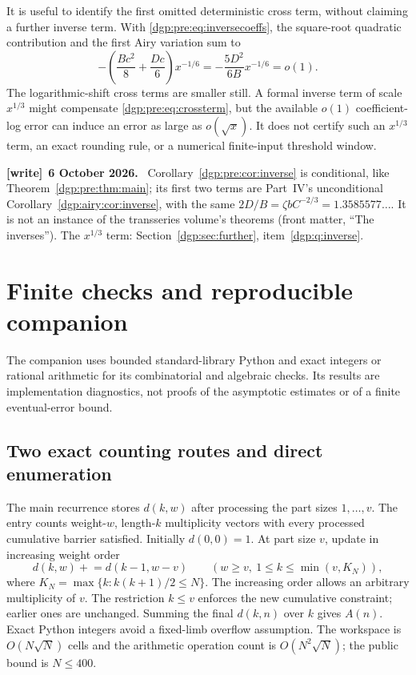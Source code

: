 \documentclass[11pt,letterpaper]{article}
\numberwithin{equation}{section}
\theoremstyle{remark}\newtheorem{remark}[theorem]{Remark}
\newenvironment{writenote}[1][]{\par\smallskip\begingroup\small
 \noindent\textbf{[write]}\if\relax\detokenize{#1}\relax\else~\textbf{#1.}\fi\ }%
 {\par\endgroup\smallskip}
\begin{document}
It is useful to identify the first omitted deterministic cross term,
without claiming a further inverse term. With \eqref{dgp:pre:eq:inversecoeffs},
the square-root quadratic contribution and the first Airy variation
sum to
\begin{equation}
 -\left(\frac{Bc^2}8+\frac{Dc}6\right)x^{-1/6}
 =-\frac{5D^2}{6B}x^{-1/6}=o(1).
 \label{dgp:pre:eq:crossterm}
\end{equation}
The logarithmic-shift cross terms are smaller still. A formal inverse
term of scale $x^{1/3}$ might compensate \eqref{dgp:pre:eq:crossterm}, but the
available $o(1)$ coefficient-log error can induce an error as large as
$o(\sqrt x)$. It does not certify such an $x^{1/3}$ term, an exact
rounding rule, or a numerical finite-input threshold window.
\begin{writenote}[6 October 2026]
Corollary~\ref{dgp:pre:cor:inverse} is conditional, like Theorem~\ref{dgp:pre:thm:main}; its first two terms are Part~IV's unconditional Corollary~\ref{dgp:airy:cor:inverse}, with the same $2D/B=\zeta bC^{-2/3}=1.3585577\ldots$. It is not an instance of the transseries volume's theorems (front matter, ``The inverses''). The $x^{1/3}$ term: Section~\ref{dgp:sec:further}, item~\ref{dgp:q:inverse}.
\end{writenote}

\section{Finite checks and reproducible companion}\label{dgp:pre:sec:companion}
The companion uses bounded standard-library Python and exact integers
or rational arithmetic for its combinatorial and algebraic checks.
Its results are implementation diagnostics, not proofs of the
asymptotic estimates or of a finite eventual-error bound.

\subsection{Two exact counting routes and direct enumeration}
The main recurrence stores $d(k,w)$ after processing the part sizes
$1,\ldots,v$. The entry counts weight-$w$, length-$k$ multiplicity
vectors with every processed cumulative barrier satisfied.
Initially $d(0,0)=1$. At part size $v$, update in increasing weight
order
\[
 d(k,w)\mathrel{+}=d(k-1,w-v)\qquad
   (w\geq v,\ 1\leq k\leq\min(v,K_N)),
\]
where $K_N=\max\{k:k(k+1)/2\leq N\}$.
The increasing order allows an arbitrary multiplicity of $v$.
The restriction $k\leq v$ enforces the new cumulative constraint;
earlier ones are unchanged. Summing the final $d(k,n)$ over $k$ gives
$A(n)$. Exact Python integers avoid a fixed-limb overflow assumption.
The workspace is $O(N\sqrt N)$ cells and the arithmetic operation
count is $O(N^2\sqrt N)$; the public bound is $N\leq400$.
\end{document}
